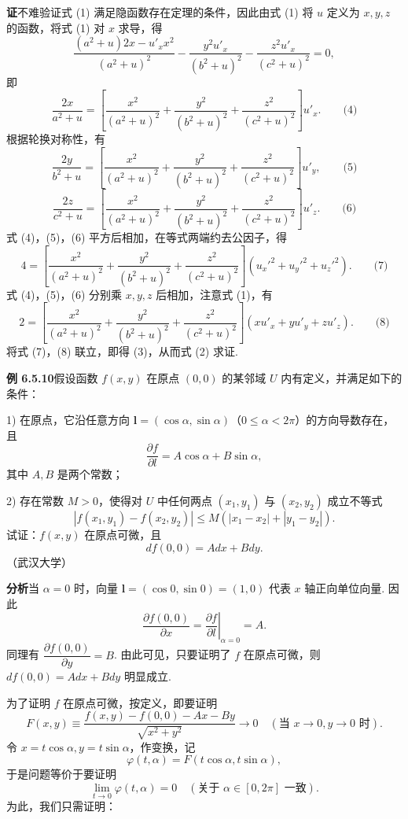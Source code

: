 \documentclass[UTF8,12pt,a4paper,fontset=fandol]{ctexart}
\begin{document}
\noindent\textbf{证}\quad 不难验证式 (1) 满足隐函数存在定理的条件，因此由式 (1) 将 $u$ 定义为 $x,y,z$ 的函数，将式 (1) 对 $x$ 求导，得
\[
  \frac{(a^2+u)2x-u'_x x^2}{(a^2+u)^2}
  -
  \frac{y^2u'_x}{(b^2+u)^2}
  -
  \frac{z^2u'_x}{(c^2+u)^2}=0,
\]
即
\[
  \frac{2x}{a^2+u}
  =
  \left[
  \frac{x^2}{(a^2+u)^2}
  +
  \frac{y^2}{(b^2+u)^2}
  +
  \frac{z^2}{(c^2+u)^2}
  \right]u'_x. \qquad\text{(4)}
\]
根据轮换对称性，有
\[
  \frac{2y}{b^2+u}
  =
  \left[
  \frac{x^2}{(a^2+u)^2}
  +
  \frac{y^2}{(b^2+u)^2}
  +
  \frac{z^2}{(c^2+u)^2}
  \right]u'_y, \qquad\text{(5)}
\]
\[
  \frac{2z}{c^2+u}
  =
  \left[
  \frac{x^2}{(a^2+u)^2}
  +
  \frac{y^2}{(b^2+u)^2}
  +
  \frac{z^2}{(c^2+u)^2}
  \right]u'_z. \qquad\text{(6)}
\]
式 (4)，(5)，(6) 平方后相加，在等式两端约去公因子，得
\[
  4=
  \left[
  \frac{x^2}{(a^2+u)^2}
  +
  \frac{y^2}{(b^2+u)^2}
  +
  \frac{z^2}{(c^2+u)^2}
  \right](u_x'^2+u_y'^2+u_z'^2). \qquad\text{(7)}
\]
式 (4)，(5)，(6) 分别乘 $x,y,z$ 后相加，注意式 (1)，有
\[
  2=
  \left[
  \frac{x^2}{(a^2+u)^2}
  +
  \frac{y^2}{(b^2+u)^2}
  +
  \frac{z^2}{(c^2+u)^2}
  \right](xu'_x+yu'_y+zu'_z). \qquad\text{(8)}
\]
将式 (7)，(8) 联立，即得 (3)，从而式 (2) 求证.

\noindent\textbf{例 6.5.10}\quad 假设函数 $f(x,y)$ 在原点 $(0,0)$ 的某邻域 $U$ 内有定义，并满足如下的条件：

1) 在原点，它沿任意方向
$\mathbf l=(\cos\alpha,\sin\alpha)$（$0\le\alpha<2\pi$）的方向导数存在，且
\[
  \frac{\partial f}{\partial l}=A\cos\alpha+B\sin\alpha,
\]
其中 $A,B$ 是两个常数；

2) 存在常数 $M>0$，使得对 $U$ 中任何两点 $(x_1,y_1)$ 与 $(x_2,y_2)$ 成立不等式
\[
  |f(x_1,y_1)-f(x_2,y_2)|\le
  M(|x_1-x_2|+|y_1-y_2|).
\]
试证：$f(x,y)$ 在原点可微，且
\[
  df(0,0)=Adx+Bdy.
\]
（武汉大学）

\noindent\textbf{分析}\quad 当 $\alpha=0$ 时，向量
$\mathbf l=(\cos0,\sin0)=(1,0)$ 代表 $x$ 轴正向单位向量. 因此
\[
  \frac{\partial f(0,0)}{\partial x}
  =
  \left.\frac{\partial f}{\partial l}\right|_{\alpha=0}=A.
\]
同理有 $\dfrac{\partial f(0,0)}{\partial y}=B$. 由此可见，只要证明了 $f$ 在原点可微，则
$df(0,0)=Adx+Bdy$ 明显成立.

为了证明 $f$ 在原点可微，按定义，即要证明
\[
  F(x,y)\equiv
  \frac{f(x,y)-f(0,0)-Ax-By}{\sqrt{x^2+y^2}}
  \to0\quad(\text{当 }x\to0,y\to0\text{ 时}).
\]
令 $x=t\cos\alpha,y=t\sin\alpha$，作变换，记
\[
  \varphi(t,\alpha)=F(t\cos\alpha,t\sin\alpha),
\]
于是问题等价于要证明
\[
  \lim_{t\to0}\varphi(t,\alpha)=0
  \quad(\text{关于 }\alpha\in[0,2\pi]\text{ 一致}).
\]
为此，我们只需证明：
\end{document}
